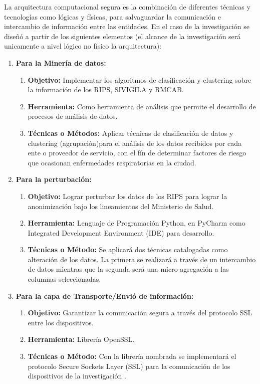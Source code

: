 \documentclass[a4paper,openright,12pt]{book}
\theoremstyle{definition}
\theoremstyle{remark}
\begin{document}
La arquitectura computacional segura es la combinación de diferentes técnicas y tecnologías como lógicas y físicas, para salvaguardar la comunicación e intercambio de información entre las entidades. En el caso de la investigación se diseñó a partir de los siguientes elementos (el alcance de la investigación será unicamente a nivel lógico no físico la arquitectura):

\begin{enumerate}
	\item \textbf{Para la Minería de datos:}
    \begin{enumerate}
    	\item \textbf{Objetivo:} Implementar los algoritmos de clasificación y clustering sobre la información de los RIPS, SIVIGILA y RMCAB.
		\item \textbf{Herramienta:} Como herramienta de análisis que permite el desarrollo de procesos de análisis de datos.
        \item \textbf{Técnicas o Métodos:} Aplicar técnicas de clasificación de datos y clustering (agrupación)para el análisis de los datos recibidos por cada ente o proveedor de servicio, con el fín de determinar factores de riesgo que ocasionan enfermedades respiratorias en la ciudad.
    \end{enumerate}
    
    \item \textbf{Para la perturbación:}
    \begin{enumerate}
		\item \textbf{Objetivo:} Lograr perturbar los datos de los RIPS para lograr la anonimización bajo los lineamientos del Ministerio de Salud.
        \item \textbf{Herramienta:} Lenguaje de Programación Python, en PyCharm como Integrated Development Environment (IDE) para desarrollo.
        \item \textbf{Técnicas o Método:} Se aplicará dos técnicas catalogadas como alteración de los datos. La primera se realizará a través de un intercambio de datos mientras que la segunda será una micro-agregación a las columnas seleccionadas.
	\end{enumerate}
    \item \textbf{Para la capa de Transporte/Envió de información:} 
        \begin{enumerate}
		\item \textbf{Objetivo:} Garantizar la comunicación segura a través del protocolo SSL entre los dispositivos.
        \item \textbf{Herramienta:} Librería OpenSSL.
        \item \textbf{Técnicas o Método:} Con la librería nombrada se implementará el protocolo Secure Sockets Layer (SSL) para la comunicación de los dispositivos de la investigación .
	\end{enumerate}
\end{enumerate}
   
\end{document}
